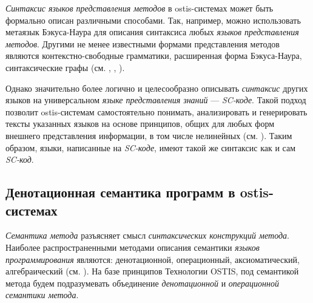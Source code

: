 \textit{Синтаксис языков представления методов} в ostis-системах может быть формально описан различными способами. Так, например, можно использовать метаязык Бэкуса-Наура для описания синтаксиса любых \textit{языков представления методов}. Другими не менее известными формами представления методов являются контекстно-свободные грамматики, расширенная форма Бэкуса-Наура, синтаксические графы (см. , , ).

Однако значительно более логично и целесообразно описывать \textit{синтаксис} других языков на универсальном \textit{языке представления знаний} --- \textit{SC-коде}. Такой подход позволит ostis-системам самостоятельно понимать, анализировать и генерировать тексты указанных языков на основе принципов, общих для любых форм внешнего представления информации, в том числе нелинейных (см. ). Таким образом, языки, написанные на \textit{SC-коде}, имеют такой же синтаксис как и сам \textit{SC-код}.

\subsection{Денотационная семантика программ в ostis-системах}
\label{sec_programs_method_den_semantic}

\textit{Семантика метода} разъясняет смысл \textit{синтаксических конструкций метода}. Наиболее распространенными методами описания семантики \textit{языков программирования} являются: денотационной, операционный, аксиоматический, алгебраический (см. ). На базе принципов Технологии OSTIS, под семантикой метода будем подразумевать объединение \textit{денотационной} и \textit{операционной семантики метода}.

